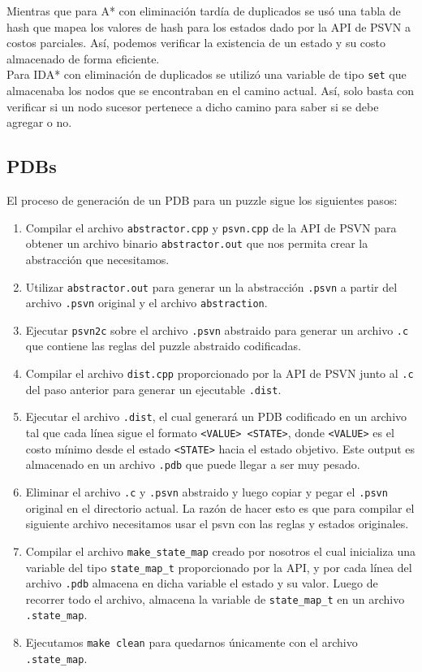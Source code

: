 \documentclass[a4paper,10pt]{article}
\begin{document}
    Mientras que para A* con eliminaci\'on tard\'ia de duplicados se us\'o una tabla
    de hash que mapea los valores de hash para los estados dado por la API de PSVN 
    a costos parciales. As\'i, podemos verificar la existencia de un estado y su costo 
    almacenado de forma eficiente. \\ 

    Para IDA* con eliminaci\'on de duplicados se utiliz\'o una variable de tipo 
    \verb|set| que almacenaba los nodos que se encontraban en el camino actual. As\'i,
    solo basta con verificar si un nodo sucesor pertenece a dicho camino para saber 
    si se debe agregar o no.

  \subsection{PDBs}
    El proceso de generaci\'on de un PDB para un puzzle sigue los siguientes pasos:
    \begin{enumerate}
      \item Compilar el archivo \verb|abstractor.cpp| y \verb|psvn.cpp| de la API de 
      PSVN para obtener un archivo binario \verb|abstractor.out| que nos permita crear 
      la abstracci\'on que necesitamos.
      \item Utilizar \verb|abstractor.out| para generar un la abstracci\'on \verb|.psvn| 
      a partir del archivo \verb|.psvn| original y el archivo \verb|abstraction|.
      \item Ejecutar \verb|psvn2c| sobre el archivo \verb|.psvn| abstraido para generar 
      un archivo \verb|.c| que contiene las reglas del puzzle abstraido codificadas.
      \item Compilar el archivo \verb|dist.cpp| proporcionado por la API de PSVN junto 
      al \verb|.c| del paso anterior para generar un ejecutable \verb|.dist|.
      \item Ejecutar el archivo \verb|.dist|, el cual generar\'a un PDB codificado en 
      un archivo tal que cada l\'inea sigue el formato \verb|<VALUE> <STATE>|, donde 
      \verb|<VALUE>| es el costo m\'inimo desde el estado \verb|<STATE>| hacia el estado 
      objetivo. Este output es almacenado en un archivo \verb|.pdb| que puede llegar a 
      ser muy pesado.
      \item Eliminar el archivo \verb|.c| y \verb|.psvn| abstraido y luego copiar y 
      pegar el \verb|.psvn| original en el directorio actual. La raz\'on de hacer esto 
      es que para compilar el siguiente archivo necesitamos usar el psvn con las reglas 
      y estados originales.
      \item Compilar el archivo \verb|make_state_map| creado por nosotros el cual 
      inicializa una variable del tipo \verb|state_map_t| proporcionado por la API, y 
      por cada l\'inea del archivo \verb|.pdb| almacena en dicha variable el estado y 
      su valor. Luego de recorrer todo el archivo, almacena la variable de 
      \verb|state_map_t| en un archivo \verb|.state_map|.
      \item Ejecutamos \verb|make clean| para quedarnos \'unicamente con el archivo 
      \verb|.state_map|.
    \end{enumerate}
\end{document}
